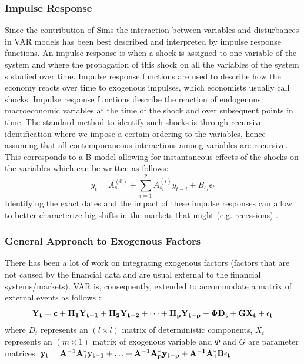 \subsubsection{Impulse Response}
Since the contribution of Sims \cite{SIMS} the interaction between variables and disturbances in VAR models has been best described and interpreted by impulse response functions.
An impulse response is when a shock is assigned to one variable of the system and where the propagation of this shock on all the variables of the system s studied over time.
Impulse response functions are used to describe how the economy reacts over time to exogenous impulses, which economists usually call shocks. Impulse response functions describe the reaction of endogenous macroeconomic variables at the time of the shock and over subsequent points in time.
The standard method to identify such shocks is through recursive identification where we impose a certain ordering to the variables, hence assuming that all contemporaneous interactions among variables are recursive. This corresponds to a B model allowing for instantaneous effects of the shocks on the variables which can be written as follows:
$$y_t=A^{(0)}_{s_t}+\sum_{i=1}^p A^{(i)}_{s_t}y_{t-i}+B_{s_t}\epsilon_t$$
Identifying the exact dates and the impact of these impulse responses can allow to better characterize big shifts in the markets that might (e.g. recessions) \cite{SIMS}.
\subsubsection{General Approach to Exogenous Factors}
There has been a lot of work on integrating exogenous factors (factors that are not caused by the financial data and are usual external to the financial systems/markets). VAR is, consequently, extended to accommodate a matrix of external events as follows \cite{VARX}: 
$$\bf{Y}_t=\bf{c}+\bf{\Pi}_1\bf{Y}_{t-1}+\bf{\Pi}_2\bf{Y}_{t-2}+\cdots+\bf{\Pi}_p\bf{Y}_{t-p}+\bf{\Phi D}_t+\bf{GX}_t+\epsilon_t$$
where $D_t$ represents an $(l \times l)$ matrix of deterministic components, $X_t$ represents an $(m \times 1)$ matrix of exogenous variable and $\Phi$ and $G$ are parameter matrices.
$\bf{y}_t=A^{-1}A^*_1\bf{y}_{t-1}+\ldots+A^{-1}A^*_p\bf{y}_{t-p}+A^{-1}A^*_1B\epsilon_t$

